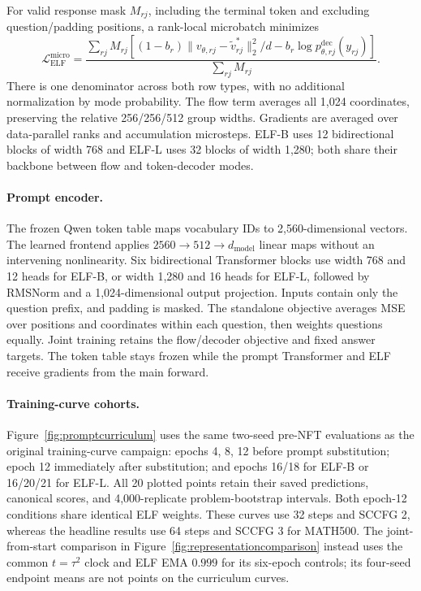For valid response mask $M_{rj}$, including the terminal token and excluding question/padding positions, a rank-local microbatch minimizes
\begin{equation}
 \mathcal L_{\mathrm{ELF}}^{\mathrm{micro}}=
 \frac{\sum_{rj}M_{rj}\left[
 (1-b_r)\|v_{\theta,rj}-\widetilde v^*_{rj}\|_2^2/d
 -b_r\log p_{\theta,rj}^{\mathrm{dec}}(y_{rj})\right]}
 {\sum_{rj}M_{rj}}.
 \label{eq:methodmicroobjective}
\end{equation}
There is one denominator across both row types, with no additional normalization by mode probability. The flow term averages all 1,024 coordinates, preserving the relative 256/256/512 group widths. Gradients are averaged over data-parallel ranks and accumulation microsteps. ELF-B uses 12 bidirectional blocks of width 768 and ELF-L uses 32 blocks of width 1,280; both share their backbone between flow and token-decoder modes.

\paragraph{Prompt encoder.}
The frozen Qwen token table maps vocabulary IDs to 2,560-dimensional vectors. The learned frontend applies $2560\to512\to d_{\mathrm{model}}$ linear maps without an intervening nonlinearity. Six bidirectional Transformer blocks use width 768 and 12 heads for ELF-B, or width 1,280 and 16 heads for ELF-L, followed by RMSNorm and a 1,024-dimensional output projection. Inputs contain only the question prefix, and padding is masked. The standalone objective averages MSE over positions and coordinates within each question, then weights questions equally. Joint training retains the flow/decoder objective and fixed answer targets. The token table stays frozen while the prompt Transformer and ELF receive gradients from the main forward.

\paragraph{Training-curve cohorts.}
Figure~\ref{fig:promptcurriculum} uses the same two-seed pre-NFT evaluations as the original training-curve campaign: epochs 4, 8, 12 before prompt substitution; epoch 12 immediately after substitution; and epochs 16/18 for ELF-B or 16/20/21 for ELF-L. All 20 plotted points retain their saved predictions, canonical scores, and 4,000-replicate problem-bootstrap intervals. Both epoch-12 conditions share identical ELF weights. These curves use 32 steps and SCCFG 2, whereas the headline results use 64 steps and SCCFG 3 for MATH500. The joint-from-start comparison in Figure~\ref{fig:representationcomparison} instead uses the common $t=\tau^2$ clock and ELF EMA $0.999$ for its six-epoch controls; its four-seed endpoint means are not points on the curriculum curves.

